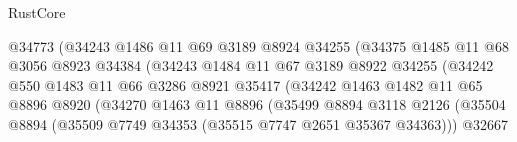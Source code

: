 \begin{lexlean}{RustCore}
\begin{coremodule}
                                    @34773
                                    (@34243
                                      @1486
                                      @11
                                      @69
                                      @3189
                                      @8924
                                      @34255
                                      (@34375
                                        @1485
                                        @11
                                        @68
                                        @3056
                                        @8923
                                        @34384
                                        (@34243
                                          @1484
                                          @11
                                          @67
                                          @3189
                                          @8922
                                          @34255
                                          (@34242
                                            @550
                                            @1483
                                            @11
                                            @66
                                            @3286
                                            @8921
                                            @35417
                                            (@34242
                                              @1463
                                              @1482
                                              @11
                                              @65
                                              @8896
                                              @8920
                                              (@34270
                                                @1463
                                                @11
                                                @8896
                                                (@35499
                                                  @8894
                                                  @3118
                                                  @2126
                                                  (@35504
                                                    @8894
                                                    (@35509
                                                      @7749
                                                      @34353
                                                      (@35515 @7747 @2651 @35367 @34363)))
                                                  @32667

\end{coremodule}
\end{lexlean}
